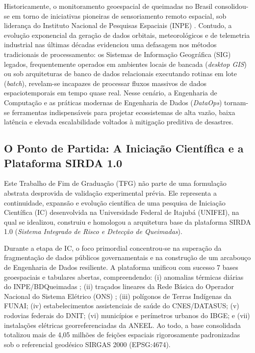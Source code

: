 Historicamente, o monitoramento geoespacial de queimadas no Brasil consolidou-se em torno de iniciativas pioneiras de sensoriamento remoto espacial, sob liderança do Instituto Nacional de Pesquisas Espaciais (INPE) \cite{inpe2025bdqueimadas}. Contudo, a evolução exponencial da geração de dados orbitais, meteorológicos e de telemetria industrial nas últimas décadas evidenciou uma defasagem nos métodos tradicionais de processamento: os Sistemas de Informação Geográfica (SIG) legados, frequentemente operados em ambientes locais de bancada (\textit{desktop GIS}) ou sob arquiteturas de banco de dados relacionais executando rotinas em lote (\textit{batch}), revelam-se incapazes de processar fluxos massivos de dados espaciotemporais em tempo quase real. Nesse cenário, a Engenharia de Computação e as práticas modernas de Engenharia de Dados (\textit{DataOps}) tornam-se ferramentas indispensáveis para projetar ecossistemas de alta vazão, baixa latência e elevada escalabilidade voltados à mitigação preditiva de desastres.

\subsection{O Ponto de Partida: A Iniciação Científica e a Plataforma SIRDA 1.0}
\label{sbc:ponto_partida_ic}

Este Trabalho de Fim de Graduação (TFG) não parte de uma formulação abstrata desprovida de validação experimental prévia. Ele representa a continuidade, expansão e evolução científica de uma pesquisa de Iniciação Científica (IC) desenvolvida na Universidade Federal de Itajubá (UNIFEI), na qual se idealizou, construiu e homologou a arquitetura base da plataforma SIRDA 1.0 (\textit{Sistema Integrado de Risco e Detecção de Queimadas}).

Durante a etapa de IC, o foco primordial concentrou-se na superação da fragmentação de dados públicos governamentais e na construção de um arcabouço de Engenharia de Dados resiliente. A plataforma unificou com sucesso 7 bases geoespaciais e tabulares abertas, compreendendo: (i) anomalias térmicas diárias do INPE/BDQueimadas \cite{inpe2025bdqueimadas}; (ii) traçados lineares da Rede Básica do Operador Nacional do Sistema Elétrico (ONS) \cite{ons2026dadosabertos}; (iii) polígonos de Terras Indígenas da FUNAI; (iv) estabelecimentos assistenciais de saúde do CNES/DATASUS; (v) rodovias federais do DNIT; (vi) municípios e perímetros urbanos do IBGE; e (vii) instalações elétricas georreferenciadas da ANEEL. Ao todo, a base consolidada totalizou mais de 4,05 milhões de feições espaciais rigorosamente padronizadas sob o referencial geodésico SIRGAS 2000 (EPSG:4674).

